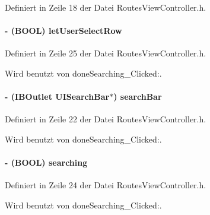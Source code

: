 Definiert in Zeile 18 der Datei RoutesViewController.h.\hypertarget{interface_routes_view_controller_ac3ac2ed389ab41c8983af66e03ce7fc3}{
\paragraph[{letUserSelectRow}]{\setlength{\rightskip}{0pt plus 5cm}-\/ (BOOL) {\bf letUserSelectRow}}\hfill}
\label{interface_routes_view_controller_ac3ac2ed389ab41c8983af66e03ce7fc3}


Definiert in Zeile 25 der Datei RoutesViewController.h.

Wird benutzt von doneSearching\_\-Clicked:.\hypertarget{interface_routes_view_controller_a761d44bec7a4c60f9b5fd12d18333686}{
\paragraph[{searchBar}]{\setlength{\rightskip}{0pt plus 5cm}-\/ (IBOutlet UISearchBar$\ast$) {\bf searchBar}}\hfill}
\label{interface_routes_view_controller_a761d44bec7a4c60f9b5fd12d18333686}


Definiert in Zeile 22 der Datei RoutesViewController.h.

Wird benutzt von doneSearching\_\-Clicked:.\hypertarget{interface_routes_view_controller_a1d43ad17a11334015dcc2050ffbdeb62}{
\paragraph[{searching}]{\setlength{\rightskip}{0pt plus 5cm}-\/ (BOOL) {\bf searching}}\hfill}
\label{interface_routes_view_controller_a1d43ad17a11334015dcc2050ffbdeb62}


Definiert in Zeile 24 der Datei RoutesViewController.h.

Wird benutzt von doneSearching\_\-Clicked:.

